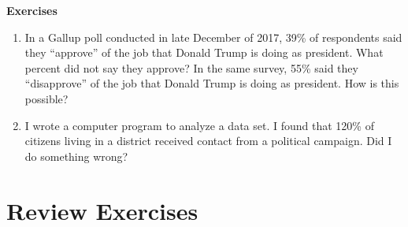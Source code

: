 \documentclass[]{book}
\providecommand{\tightlist}{%
  \setlength{\itemsep}{0pt}\setlength{\parskip}{0pt}}
\theoremstyle{definition}
\theoremstyle{definition}
\theoremstyle{definition}
\theoremstyle{remark}
\begin{document}
\textbf{Exercises}

\begin{enumerate}
\def\labelenumi{\arabic{enumi}.}
\tightlist
\item
  In a Gallup poll conducted in late December of 2017, 39\% of
  respondents said they ``approve'' of the job that Donald Trump is
  doing as president. What percent did not say they approve? In the same
  survey, 55\% said they ``disapprove'' of the job that Donald Trump is
  doing as president. How is this possible?
\item
  I wrote a computer program to analyze a data set. I found that 120\%
  of citizens living in a district received contact from a political
  campaign. Did I do something wrong?
\end{enumerate}

\section{Review Exercises}\label{review-exercises-1}
\end{document}
